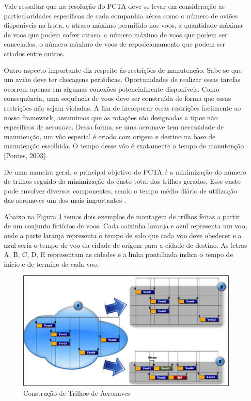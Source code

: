 	Vale ressaltar que na resolução do PCTA deve-se levar em consideração as particularidades especificas de cada companhia aérea como o número de aviões disponíveis na frota, o atraso máximo permitido nos voos, a quantidade máxima de voos que podem sofrer atraso, o número máximo de voos que podem ser cancelados, o número máximo de voos de reposicionamento que podem ser criados entre outros.
 
	Outro aspecto importante diz respeito às restrições de manutenção. Sabe-se que um avião deve ter checagens periódicas. Oportunidades de realizar essas tarefas ocorrem apenas em algumas conexões potencialmente disponíveis. Como consequência, uma sequência de voos deve ser construída de forma que essas restrições não sejam violadas. A fim de incorporar essas restrições facilmente ao nosso framework, assumimos que as rotações são designadas a tipos não específicos de aeronave. Dessa forma, se uma aeronave tem necessidade de manutenção, um vôo especial é criado com origem e destino na base de manutenção escolhida. O tempo desse vôo é exatamente o tempo de manutenção [Pontes, 2003].
 
	De uma maneira geral, o principal objetivo do PCTA é a minimização do número de trilhos seguido da minimização do custo total dos trilhos gerados. Esse custo pode envolver diversos componentes, sendo o tempo médio diário de utilização das aeronaves um dos mais importantes \citep{abiliolivro}.
 
	Abaixo na Figura \ref{arpexample} temos dois exemplos de montagem de trilhos feitas a partir de um conjunto fictícios de voos. Cada caixinha laranja e azul representa um voo, onde a parte laranja representa o tempo de solo que cada voo deve obedecer e a azul seria o tempo de voo da cidade de origem para a cidade de destino. As letras A, B, C, D, E representam as cidades e a linha pontilhada indica o tempo de inicio e de termino de cada voo.

\begin{figure}[ht]
	\centering
	\includegraphics[scale=0.9]{./img/arpexample}
	\caption{Construção de Trilhos de Aeronaves}
	\label{arpexample}
\end{figure}

